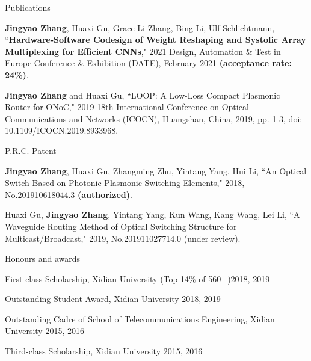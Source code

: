 \documentclass{resume} %
\begin{document}
\begin{rSection}{Publications}

\begin{rSubsection}{}{}{}{}
	\item {\bf Jingyao Zhang}, Huaxi Gu, Grace Li Zhang, Bing Li, Ulf Schlichtmann, ``{\bf Hardware-Software Codesign of Weight Reshaping and Systolic Array Multiplexing for Efficient CNNs}," 2021 Design, Automation \& Test in Europe Conference \& Exhibition (DATE), February 2021 {\bf (acceptance rate: 24\%)}.
	\item {\bf Jingyao Zhang} and Huaxi Gu, ``LOOP: A Low-Loss Compact Plasmonic Router for ONoC," 2019 18th International Conference on Optical Communications and Networks (ICOCN), Huangshan, China, 2019, pp. 1-3, doi: 10.1109/ICOCN.2019.8933968.

\end{rSubsection}

\end{rSection}

\begin{rSection}{P.R.C. Patent}
	\begin{rSubsection}{}{}{}{}
		\item {\bf Jingyao Zhang}, Huaxi Gu, Zhangming Zhu, Yintang Yang, Hui Li, ``An Optical Switch Based on Photonic-Plasmonic Switching Elements," 2018, No.201910618044.3 {\bf (authorized)}.
		\item Huaxi Gu, {\bf Jingyao Zhang}, Yintang Yang, Kun Wang, Kang Wang, Lei Li, ``A Waveguide Routing Method of Optical Switching Structure for Multicast/Broadcast," 2019, No.201911027714.0 (under review).
	\end{rSubsection}
\end{rSection}



\begin{rSection}{Honours and awards}
	\begin{rSubsection}{}{}{}{}
		\item First-class Scholarship, Xidian University (Top 14\% of 560+)\hfill {2018, 2019}
		\item Outstanding Student Award, Xidian University \hfill {2018, 2019}
		\item Outstanding Cadre of School of Telecommunications Engineering, Xidian University \hfill {2015, 2016}
		\item Third-class Scholarship, Xidian University \hfill {2015, 2016}


	\end{rSubsection}
	
\end{rSection}
\end{document}

